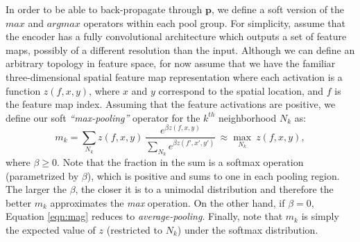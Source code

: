 In order to be able to back-propagate through $\mathbf{p}$, we define a soft version of the $max$ and $argmax$ operators within each pool group. For simplicity, assume that the encoder has a fully convolutional architecture which outputs a set of feature maps, possibly of a different resolution than the input. 
Although we can define an arbitrary topology in feature space, for now assume that we have the familiar three-dimensional spatial feature map representation where each activation is a function $z(f,x,y)$, where $x$ and $y$ correspond to the spatial location, and $f$ is the feature map index. Assuming that the feature activations are positive, we define our soft \emph{``max-pooling''} operator for the $k^{th}$ neighborhood $N_k$ as:
\begin{equation}
m_k = \sum_{N_k} z(f,x,y)\!~ \frac{e^{\beta z(f,x,y)}}{\sum_{N_k}e^{\beta z(f\prime, x\prime, y\prime )}}\,\approx\underset{N_k}\max~z(f,x,y),
\label{eqn:mag}
\end{equation}   
where $\beta \geq 0$.
Note that the fraction in the sum is a softmax operation (parametrized by $\beta$), which is positive and sums to one in each pooling region. The larger the $\beta$, the closer it is to a unimodal distribution and therefore the better $m_k$ approximates the \emph{max} operation. On the other hand, if $\beta=0$, Equation \ref{eqn:mag} reduces to \emph{average-pooling}. Finally, note that $m_k$ is simply the expected value of $z$ (restricted to $N_k$) under the softmax distribution.

